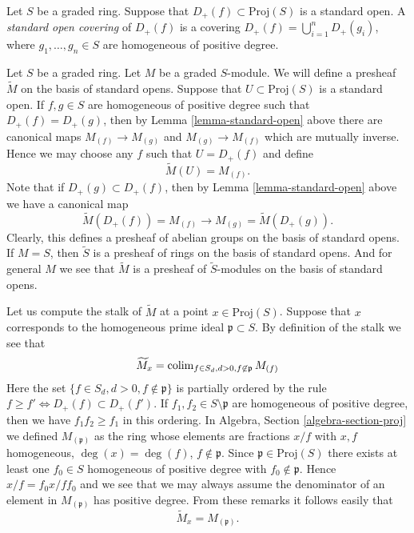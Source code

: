 \begin{definition}
\label{definition-standard-covering}
Let $S$ be a graded ring.
Suppose that $D_{+}(f) \subset \text{Proj}(S)$ is a standard
open. A {\it standard open covering} of $D_{+}(f)$
is a covering $D_{+}(f) = \bigcup_{i = 1}^n D_{+}(g_i)$,
where $g_1, \ldots, g_n \in S$ are homogeneous of positive degree.
\end{definition}

\noindent
Let $S$ be a graded ring. Let $M$ be a graded $S$-module. We will define
a presheaf $\widetilde M$ on the basis of standard opens.
Suppose that $U \subset \text{Proj}(S)$ is a standard open.
If $f, g \in S$ are homogeneous of positive degree
such that $D_{+}(f) = D_{+}(g)$, then
by Lemma \ref{lemma-standard-open} above there are canonical
maps $M_{(f)} \to M_{(g)}$ and $M_{(g)} \to M_{(f)}$ which are
mutually inverse. Hence we may choose any $f$ such that $U = D_{+}(f)$
and define
$$
\widetilde M(U) = M_{(f)}.
$$
Note that if $D_{+}(g) \subset D_{+}(f)$, then by
Lemma \ref{lemma-standard-open} above we have
a canonical map
$$
\widetilde M(D_{+}(f)) = M_{(f)} \longrightarrow
M_{(g)} = \widetilde M(D_{+}(g)).
$$
Clearly, this defines a presheaf of abelian groups on the basis
of standard opens. If $M = S$, then $\widetilde S$ is a presheaf
of rings on the basis of standard opens. And for general $M$ we
see that $\widetilde M$ is a presheaf of $\widetilde S$-modules
on the basis of standard opens.

\medskip\noindent
Let us compute the stalk of $\widetilde M$ at a point
$x \in \text{Proj}(S)$.
Suppose that $x$ corresponds to the homogeneous prime
ideal $\mathfrak p \subset S$.
By definition of the stalk we see that
$$
\widetilde M_x
=
\mathop{\rm colim}\nolimits_{f\in S_d, d > 0, f\not\in \mathfrak p} M_{(f)}
$$
Here the set $\{f\in S_d, d > 0, f\not\in \mathfrak p\}$ is partially
ordered by the rule $f \geq f' \Leftrightarrow D_{+}(f) \subset D_{+}(f')$.
If $f_1, f_2 \in S \setminus \mathfrak p$ are homogeneous of positive
degree, then we have
$f_1f_2 \geq f_1$ in this ordering. In
Algebra, Section \ref{algebra-section-proj}
we defined $M_{(\mathfrak p)}$ as the ring whose elements are fractions
$x/f$ with $x, f$ homogeneous, $\deg(x) = \deg(f)$, $f \not \in \mathfrak p$.
Since $\mathfrak p \in \text{Proj}(S)$ there exists at least
one $f_0 \in S$ homogeneous of positive degree with $f_0 \not\in \mathfrak p$.
Hence $x/f = f_0x/ff_0$ and we see that we may always assume
the denominator of an element in $M_{(\mathfrak p)}$ has positive degree.
From these remarks it follows easily that
$$
\widetilde M_x = M_{(\mathfrak p)}.
$$


